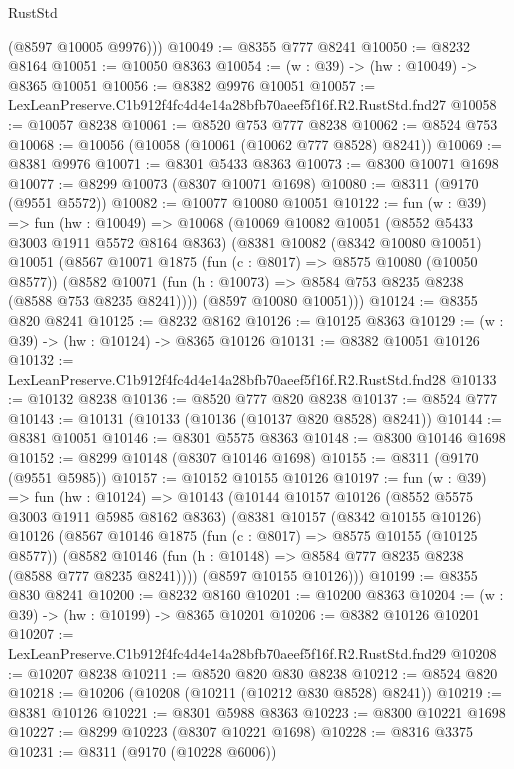 \begin{lexlean}{RustStd}
\begin{coremodule}
        (@8597 @10005 @9976)))
@10049 := @8355 @777 @8241
@10050 := @8232 @8164
@10051 := @10050 @8363
@10054 := (w : @39) -> (hw : @10049) -> @8365 @10051
@10056 := @8382 @9976 @10051
@10057 := LexLeanPreserve.C1b912f4fc4d4e14a28bfb70aeef5f16f.R2.RustStd.fnd27
@10058 := @10057 @8238
@10061 := @8520 @753 @777 @8238
@10062 := @8524 @753
@10068 := @10056 (@10058 (@10061 (@10062 @777 @8528) @8241))
@10069 := @8381 @9976
@10071 := @8301 @5433 @8363
@10073 := @8300 @10071 @1698
@10077 := @8299 @10073 (@8307 @10071 @1698)
@10080 := @8311 (@9170 (@9551 @5572))
@10082 := @10077 @10080 @10051
@10122 := fun (w : @39) =>
  fun (hw : @10049) =>
  @10068
    (@10069
      @10082
      @10051
      (@8552 @5433 @3003 @1911 @5572 @8164 @8363)
      (@8381
        @10082
        (@8342 @10080 @10051)
        @10051
        (@8567
          @10071
          @1875
          (fun (c : @8017) => @8575 @10080 (@10050 @8577))
          (@8582 @10071 (fun (h : @10073) => @8584 @753 @8235 @8238 (@8588 @753 @8235 @8241))))
        (@8597 @10080 @10051)))
@10124 := @8355 @820 @8241
@10125 := @8232 @8162
@10126 := @10125 @8363
@10129 := (w : @39) -> (hw : @10124) -> @8365 @10126
@10131 := @8382 @10051 @10126
@10132 := LexLeanPreserve.C1b912f4fc4d4e14a28bfb70aeef5f16f.R2.RustStd.fnd28
@10133 := @10132 @8238
@10136 := @8520 @777 @820 @8238
@10137 := @8524 @777
@10143 := @10131 (@10133 (@10136 (@10137 @820 @8528) @8241))
@10144 := @8381 @10051
@10146 := @8301 @5575 @8363
@10148 := @8300 @10146 @1698
@10152 := @8299 @10148 (@8307 @10146 @1698)
@10155 := @8311 (@9170 (@9551 @5985))
@10157 := @10152 @10155 @10126
@10197 := fun (w : @39) =>
  fun (hw : @10124) =>
  @10143
    (@10144
      @10157
      @10126
      (@8552 @5575 @3003 @1911 @5985 @8162 @8363)
      (@8381
        @10157
        (@8342 @10155 @10126)
        @10126
        (@8567
          @10146
          @1875
          (fun (c : @8017) => @8575 @10155 (@10125 @8577))
          (@8582 @10146 (fun (h : @10148) => @8584 @777 @8235 @8238 (@8588 @777 @8235 @8241))))
        (@8597 @10155 @10126)))
@10199 := @8355 @830 @8241
@10200 := @8232 @8160
@10201 := @10200 @8363
@10204 := (w : @39) -> (hw : @10199) -> @8365 @10201
@10206 := @8382 @10126 @10201
@10207 := LexLeanPreserve.C1b912f4fc4d4e14a28bfb70aeef5f16f.R2.RustStd.fnd29
@10208 := @10207 @8238
@10211 := @8520 @820 @830 @8238
@10212 := @8524 @820
@10218 := @10206 (@10208 (@10211 (@10212 @830 @8528) @8241))
@10219 := @8381 @10126
@10221 := @8301 @5988 @8363
@10223 := @8300 @10221 @1698
@10227 := @8299 @10223 (@8307 @10221 @1698)
@10228 := @8316 @3375
@10231 := @8311 (@9170 (@10228 @6006))

\end{coremodule}
\end{lexlean}
